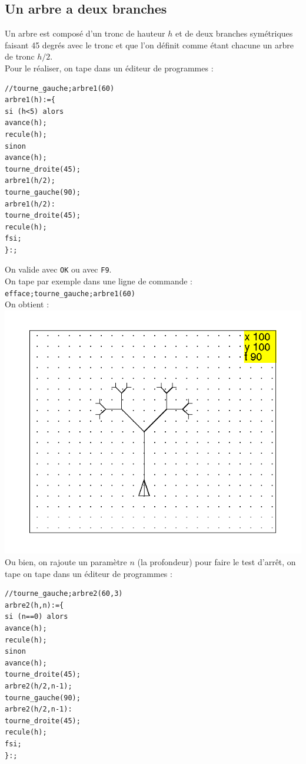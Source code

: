 \documentclass[a4paper,11pt]{book}
\begin{document}
\subsection{Un arbre a deux branches}
Un arbre est compos\'e d'un tronc de hauteur $h$ et de deux branches 
sym\'etriques faisant 45 degr\'es avec le tronc et que l'on d\'efinit comme 
\'etant chacune un arbre de tronc $h/2$.\\
Pour le r\'ealiser, on tape dans un \'editeur de programmes : 
\begin{verbatim}
//tourne_gauche;arbre1(60)
arbre1(h):={
si (h<5) alors
avance(h);
recule(h);
sinon
avance(h);
tourne_droite(45);
arbre1(h/2);
tourne_gauche(90);
arbre1(h/2):
tourne_droite(45);
recule(h);
fsi;
}:;
\end{verbatim}
On valide avec {\tt OK} ou avec {\tt F9}.\\
On tape par exemple dans une ligne de commande :\\
{\tt efface;tourne\_gauche;arbre1(60)}\\
On obtient :\\
\includegraphics[width=\textwidth]{tortarb1}\\
Ou bien, on rajoute un param\`etre $n$ (la profondeur) pour faire le test 
d'arr\^et, on tape on tape dans un \'editeur de programmes : 
\begin{verbatim}
//tourne_gauche;arbre2(60,3)
arbre2(h,n):={
si (n==0) alors
avance(h);
recule(h);
sinon
avance(h);
tourne_droite(45);
arbre2(h/2,n-1);
tourne_gauche(90);
arbre2(h/2,n-1):
tourne_droite(45);
recule(h);
fsi;
}:;
\end{verbatim}
\end{document}
